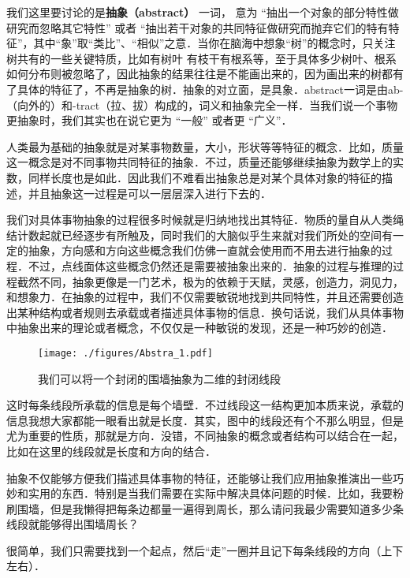 

\begin{issues}
\issueTODO
\end{issues}

我们这里要讨论的是\textbf{抽象（abstract）} 一词， 意为 “抽出一个对象的部分特性做研究而忽略其它特性” 或者 “抽出若干对象的共同特征做研究而抛弃它们的特有特征”，其中“象”取“类比”、“相似”之意．当你在脑海中想象“树”的概念时，只关注树共有的一些关键特质，比如有树叶 有枝干有根系等，至于具体多少树叶、根系如何分布则被忽略了，因此抽象的结果往往是不能画出来的，因为画出来的树都有了具体的特征了，不再是抽象的树．抽象的对立面，是具象．abstract一词是由ab-（向外的）和-tract（拉、拔）构成的，词义和抽象完全一样．当我们说一个事物更抽象时，我们其实也在说它更为 “一般” 或者更 “广义”．


人类最为基础的抽象就是对某事物数量，大小，形状等等特征的概念．比如，质量这一概念是对不同事物共同特征的抽象．不过，质量还能够继续抽象为数学上的实数，同样长度也是如此．因此我们不难看出抽象总是对某个具体对象的特征的描述，并且抽象这一过程是可以一层层深入进行下去的．

我们对具体事物抽象的过程很多时候就是归纳地找出其特征．物质的量自从人类绳结计数起就已经逐步有所触及，同时我们的大脑似乎生来就对我们所处的空间有一定的抽象，方向感和方向这些概念我们仿佛一直就会使用而不用去进行抽象的过程．不过，点线面体这些概念仍然还是需要被抽象出来的．抽象的过程与推理的过程截然不同，抽象更像是一门艺术，极为的依赖于天赋，灵感，创造力，洞见力，和想象力．在抽象的过程中，我们不仅需要敏锐地找到共同特性，并且还需要创造出某种结构或者规则去承载或者描述具体事物的信息．换句话说，我们从具体事物中抽象出来的理论或者概念，不仅仅是一种敏锐的发现，还是一种巧妙的创造．

\begin{figure}[ht]
\centering
\texttt{[image: ./figures/Abstra\_1.pdf]}
\caption{我们可以将一个封闭的围墙抽象为二维的封闭线段} \label{Abstra_fig1}
\end{figure}

这时每条线段所承载的信息是每个墙壁．不过线段这一结构更加本质来说，承载的信息我想大家都能一眼看出就是长度．其实，图中的线段还有个不那么明显，但是尤为重要的性质，那就是方向．没错，不同抽象的概念或者结构可以结合在一起，比如在这里的线段就是长度和方向的结合．

抽象不仅能够方便我们描述具体事物的特征，还能够让我们应用抽象推演出一些巧妙和实用的东西．特别是当我们需要在实际中解决具体问题的时候．比如，我要粉刷围墙，但是我懒得把每条边都量一遍得到周长，那么请问我最少需要知道多少条线段就能够得出围墙周长？

很简单，我们只需要找到一个起点，然后“走”一圈并且记下每条线段的方向（上下左右）．


